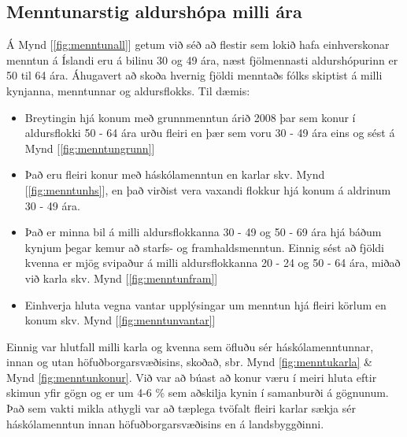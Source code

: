 \documentclass[12pt, git, draft]{rureport}
\begin{document}
\subsection{Menntunarstig aldurshópa milli ára}
Á Mynd [\ref{fig:menntunall}] getum við séð að flestir sem lokið hafa einhverskonar menntun á Íslandi eru á bilinu 30 og 49 ára, næst fjölmennasti aldurshópurinn er 50 til 64 ára.
Áhugavert að skoða hvernig fjöldi menntaðs fólks skiptist á milli kynjanna, menntunnar og aldursflokks. Til dæmis:
\begin{itemize}  
	
	\item Breytingin hjá konum með grunnmenntun árið 2008 þar sem konur í aldursflokki 50 - 64 ára urðu fleiri en þær sem voru 30 - 49 ára eins og sést á Mynd [\ref{fig:menntungrunn}]
	
	\item Það eru fleiri konur með háskólamenntun en karlar skv. Mynd [\ref{fig:menntunhs}], en það virðist vera vaxandi flokkur hjá konum á aldrinum 30 - 49 ára.
	
	
	\item Það er minna bil á milli aldursflokkanna 30 - 49 og 50 - 69 ára hjá báðum kynjum þegar kemur að starfs- og framhaldsmenntun. Einnig sést að fjöldi kvenna er mjög svipaður á milli aldursflokkanna 20 - 24 og 50 - 64 ára, miðað við karla skv. Mynd [\ref{fig:menntunfram}] 
	
	\item Einhverja hluta vegna vantar upplýsingar um menntun hjá fleiri körlum en konum skv. Mynd [\ref{fig:menntunvantar}]
	
\end{itemize}
Einnig var hlutfall milli karla og kvenna sem öfluðu sér háskólamenntunnar, innan og utan höfuðborgarsvæðisins, skoðað, sbr. Mynd \ref{fig:menntukarla} \& Mynd \ref{fig:menntunkonur}. Við var að búast að konur væru í meiri hluta eftir skimun yfir gögn og er um 4-6 \% sem aðskilja kynin í samanburði á gögnunum. Það sem vakti mikla athygli var að tæplega tvöfalt fleiri karlar sækja sér háskólamenntun innan höfuðborgarsvæðisins en á landsbyggðinni.



\end{document}

